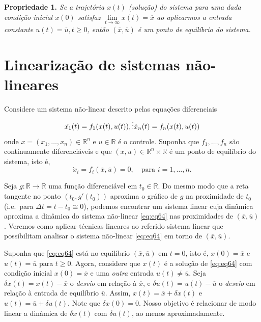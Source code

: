 \documentclass[
]{book}
\theoremstyle{definition}
\theoremstyle{definition}
\theoremstyle{definition}
\theoremstyle{remark}
\begin{document}
\textbf{Propriedade 1.} \emph{Se a trajetória \(x(t)\) (solução) do sistema para uma dada condição inicial \(x(0)\) satisfaz \(\lim\limits_{t\to\infty}{x(t)} = \overline{x}\) ao aplicarmos a entrada constante \(u(t) = \overline{u}, t \geq 0\), então \((\overline{x}, \overline{u})\) é um ponto de equilíbrio do sistema.}

\hypertarget{linearizauxe7uxe3o-de-sistemas-nuxe3o-lineares}{%
\section{Linearização de sistemas não-lineares}\label{linearizauxe7uxe3o-de-sistemas-nuxe3o-lineares}}

Considere um sistema não-linear descrito pelas equações diferenciais
\[
\dot{x_1}(t) = f_1(x(t),u(t)), \\
\vdots \label{eq:eq64} \\ 
\dot{x}_n(t) = f_n(x(t),u(t))
\]
onde \(x = (x_1, \dots, x_n) \in \mathbb{R}^n\) e \(u \in \mathbb{R}\) é o controle. Suponha que \(f_1, \dots, f_n\) são continuamente diferenciáveis e que \((\overline{x}, \overline{u}) \in \mathbb{R}^n \times \mathbb{R}\) é um ponto de equilíbrio do sistema, isto é,
\[
\dot{x}_i = f_i(\overline{x}, \overline{u}) = 0, \quad \text{para } i = 1, \dots, n.
\]

Seja \(g:\mathbb{R} \to \mathbb{R}\) uma função diferenciável em \(t_0 \in \mathbb{R}\). Do mesmo modo que a reta tangente no ponto \((t_0,g'(t_0))\) aproxima o gráfico de \(g\) na proximidade de \(t_0\) (i.e.~para \(\Delta t = t - t_0 \cong 0\)), podemos encontrar um sistema linear cuja dinâmica aproxima a dinâmica do sistema não-linear \eqref{eq:eq64} nas proximidades de \((\overline{x}, \overline{u})\). Veremos como aplicar técnicas lineares ao referido sistema linear que possibilitam analisar o sistema não-linear \eqref{eq:eq64} em torno de \((\overline{x}, \overline{u})\).

Suponha que \eqref{eq:eq64} está no equilíbrio \((\overline{x}, \overline{u})\) em \(t=0\), isto é, \(x(0) = \overline{x}\) e \(u(t) = \overline{u}\) para \(t \geq 0\). Agora, considere que \(x(t)\) é a solução de \eqref{eq:eq64} com condição inicial \(x(0) = \overline{x}\) e uma \emph{outra} entrada \(u(t) \neq \overline{u}\). Seja \(\delta x(t) = x(t) -\overline{x}\) o \emph{desvio} em relação à \(\overline{x}\), e \(\delta u(t) = u(t) - \overline{u}\) o \emph{desvio} em relação à entrada de equilíbrio \(\overline{u}\). Assim, \(x(t) = \overline{x} + \delta x(t)\) e \(u(t) = \overline{u} + \delta u(t)\). Note que \(\delta x(0) = 0\). Nosso objetivo é relacionar de modo linear a dinâmica de \(\delta x(t)\) com \(\delta u(t)\), ao menos aproximadamente.
\end{document}

